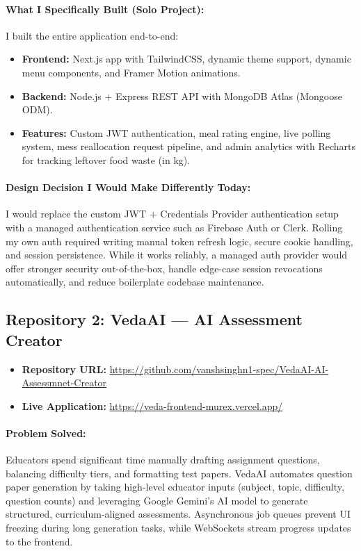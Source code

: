 \documentclass[11pt, a4paper]{article}
\begin{document}
\paragraph{What I Specifically Built (Solo Project):}
I built the entire application end-to-end:
\begin{itemize}[nosep]
  \item \textbf{Frontend:} Next.js app with TailwindCSS, dynamic theme support, dynamic menu components, and Framer Motion animations.
  \item \textbf{Backend:} Node.js + Express REST API with MongoDB Atlas (Mongoose ODM).
  \item \textbf{Features:} Custom JWT authentication, meal rating engine, live polling system, mess reallocation request pipeline, and admin analytics with Recharts for tracking leftover food waste (in kg).
\end{itemize}

\paragraph{Design Decision I Would Make Differently Today:}
I would replace the custom JWT + Credentials Provider authentication setup with a managed authentication service such as Firebase Auth or Clerk. Rolling my own auth required writing manual token refresh logic, secure cookie handling, and session persistence. While it works reliably, a managed auth provider would offer stronger security out-of-the-box, handle edge-case session revocations automatically, and reduce boilerplate codebase maintenance.

\bigskip

\subsection{Repository 2: VedaAI --- AI Assessment Creator}

\begin{itemize}[leftmargin=*]
  \item \textbf{Repository URL:} \url{https://github.com/vanshsinghn1-spec/VedaAI-AI-Assessmnet-Creator}
  \item \textbf{Live Application:} \url{https://veda-frontend-murex.vercel.app/}
\end{itemize}

\paragraph{Problem Solved:}
Educators spend significant time manually drafting assignment questions, balancing difficulty tiers, and formatting test papers. VedaAI automates question paper generation by taking high-level educator inputs (subject, topic, difficulty, question counts) and leveraging Google Gemini's AI model to generate structured, curriculum-aligned assessments. Asynchronous job queues prevent UI freezing during long generation tasks, while WebSockets stream progress updates to the frontend.
\end{document}
